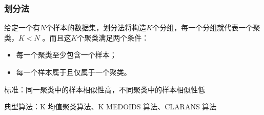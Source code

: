 \subsubsection{划分法}
\begin{definition}[划分法]
    给定一个有$N $个样本的数据集，划分法将构造$K $个分组，每一个分组就代表一个聚类，$K<N$ 。而且这$K $个聚类满足两个条件：
    \begin{itemize}
        \item 每一个聚类至少包含一个样本；
        \item 每一个样本属于且仅属于一个聚类。
    \end{itemize}

    \textcolor{main1}{标准：}同一聚类中的样本相似性高，不同聚类中的样本相似性低

    \textcolor{main1}{典型算法：}K 均值聚类算法、K MEDOIDS 算法、CLARANS 算法
\end{definition}

